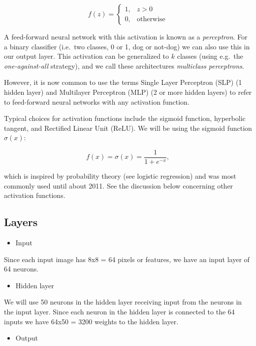 \documentclass[%
oneside,                 %
final,                   %
10pt]{article}
\begin{document}
$$ f(z) = 
\begin{cases}
1,  &  z > 0\\
0,  & \text{otherwise}
\end{cases}
$$

A feed-forward neural network with this activation is known as a \emph{perceptron}.  
For a binary classifier (i.e.~two classes, 0 or 1, dog or not-dog) we can also use this in our output layer.  
This activation can be generalized to $k$ classes (using e.g.~the \emph{one-against-all} strategy), 
and we call these architectures \emph{multiclass perceptrons}.  

However, it is now common to use the terms Single Layer Perceptron (SLP) (1 hidden layer) and  
Multilayer Perceptron (MLP) (2 or more hidden layers) to refer to feed-forward neural networks with any activation function.  

Typical choices for activation functions include the sigmoid function, hyperbolic tangent, and Rectified Linear Unit (ReLU).  
We will be using the sigmoid function $\sigma(x)$:  

$$ f(x) = \sigma(x) = \frac{1}{1 + e^{-x}} ,$$

which is inspired by probability theory (see logistic regression) and was most commonly used until about 2011. See the discussion below concerning other activation functions.

\subsection*{Layers}

\begin{itemize}
\item Input 
\end{itemize}

\noindent
Since each input image has 8x8 = 64 pixels or features, we have an input layer of 64 neurons.  

\begin{itemize}
\item Hidden layer
\end{itemize}

\noindent
We will use 50 neurons in the hidden layer receiving input from the neurons in the input layer.  
Since each neuron in the hidden layer is connected to the 64 inputs we have 64x50 = 3200 weights to the hidden layer.  

\begin{itemize}
\item Output
\end{itemize}
\end{document}

